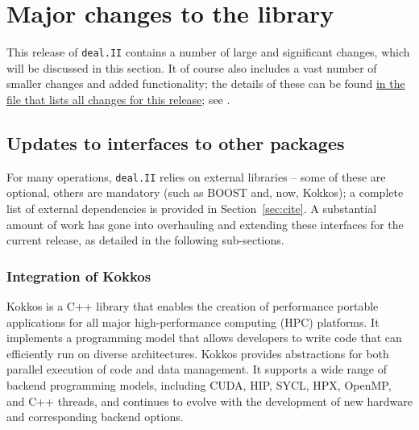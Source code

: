 \documentclass{ansarticle-preprint}
\newcommand{\specialword}[1]{\texttt{#1}}
\newcommand{\dealii}{{\specialword{deal.II}}\xspace}
\begin{document}



\section{Major changes to the library}
\label{sec:major}

This release of \dealii contains a number of large and significant changes,
which will be discussed in this section.
It of course also includes a
vast number of smaller changes and added functionality; the details of these
can be found
\href{https://dealii.org/developer/doxygen/deal.II/changes_between_9_4_2_and_9_5_0.html}
{in the file that lists all changes for this release}; see \cite{changes95}.


\subsection{Updates to interfaces to other packages}\label{sec:external}

For many operations, \dealii{} relies on external libraries -- some of
these are optional, others are mandatory (such as BOOST and, now,
Kokkos); a complete list of external dependencies is provided in
Section~\ref{sec:cite}. A substantial amount of work has gone into
overhauling and extending these interfaces for the current release, as
detailed in the following sub-sections.


\subsubsection{Integration of Kokkos}\label{sec:kokkos}

Kokkos \cite{trott2022} is a C++ library that enables the creation of
performance portable applications for all major high-performance computing (HPC)
platforms. It implements a programming model that allows developers to write
code that can efficiently run on diverse architectures. Kokkos provides
abstractions for both parallel execution of code and data management. It
supports a wide range of backend programming models, including CUDA, HIP, SYCL,
HPX, OpenMP, and C++ threads, and continues to evolve with the development of
new hardware and corresponding backend options.
\end{document}
